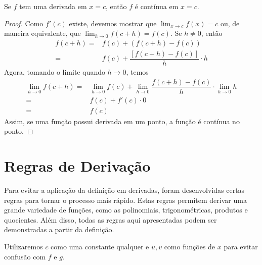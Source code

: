 \begin{teo}
Se $f$ tem uma derivada em $x=c$, então $f$ é contínua em $x=c$.
\begin{proof}
Como $f'(c)$ existe, devemos mostrar que $\lim_{x\rightarrow c}f(x)=c$ ou, de maneira equivalente, que $\lim_{h\rightarrow 0}f(c+h)=f(c)$. Se $h\neq0$, então
\begin{align*}
f(c+h)=&f(c)+(f(c+h)-f(c))\\
=&f(c)+\dfrac{\left[f(c+h)-f(c)\right]}{h}\cdot h
\end{align*}
Agora, tomando o limite quando $h \rightarrow 0 $, temos
\begin{align*}
\lim_{h\rightarrow0}f(c+h)=&\lim_{h\rightarrow0}f(c)+\lim_{h\rightarrow0}\dfrac{f(c+h)-f(c)}{h}\cdot \lim_{h\rightarrow0}h \\
=&f(c)+f'(c)\cdot0\\
=&f(c)
\end{align*}
Assim, se uma função possui derivada em um ponto, a função é contínua no ponto.
\end{proof}
\end{teo}

\section{Regras de Derivação}
Para evitar a aplicação da definição em derivadas, foram desenvolvidas certas regras para tornar o processo mais rápido. Estas regras permitem derivar uma grande variedade de funções, como as polinomiais, trigonométricas, produtos e quocientes. Além disso, todas as regras aqui apresentadas podem ser demonstradas a partir da definição. \par Utilizaremos $c$ como uma constante qualquer e $u,v$ como funções de $x$ para evitar confusão com $f$ e $g$.

